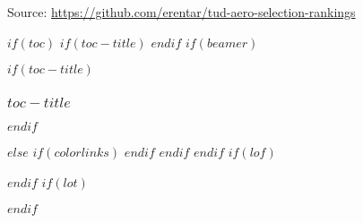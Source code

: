 Source: \url{https://github.com/erentar/tud-aero-selection-rankings}

$if(toc)$
$if(toc-title)$
\renewcommand*\contentsname{$toc-title$}
$endif$
$if(beamer)$
\begin{frame}[allowframebreaks]
$if(toc-title)$
  \frametitle{$toc-title$}
$endif$
  \setcounter{tocdepth}{$toc-depth$}
  \tableofcontents
\end{frame}
$else$
{
$if(colorlinks)$
\hypersetup{linkcolor=$if(toccolor)$$toccolor$$else$$endif$}
$endif$
\setcounter{tocdepth}{$toc-depth$}
\newpage
\vspace*{\fill}
\tableofcontents
\vspace*{\fill}
\newpage
}
$endif$
$endif$
$if(lof)$
\listoffigures
$endif$
$if(lot)$
\listoftables
$endif$